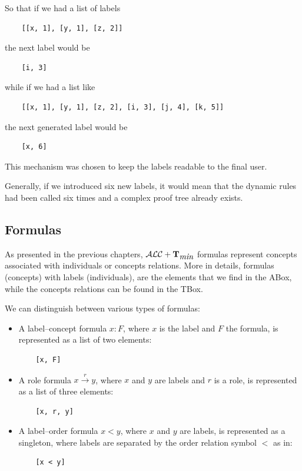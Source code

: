 \documentclass[a4paper, 11pt, oneside]{duthesis}
\newcommand{\tip}{{\bf T}}
\newcommand{\alctmin}{\mathcal{ALC}+\tip_{\mbox{\em min}}}
\newcommand{\trans}[1]{\stackrel{#1}{\longrightarrow}}
\begin{document}
\newpage

So that if we had a list of labels
\begin{verbatim}
    [[x, 1], [y, 1], [z, 2]]
\end{verbatim}
the next label would be
\begin{verbatim}
    [i, 3]
\end{verbatim}
while if we had a list like
\begin{verbatim}
    [[x, 1], [y, 1], [z, 2], [i, 3], [j, 4], [k, 5]]
\end{verbatim}
the next generated label would be
\begin{verbatim}
    [x, 6]
\end{verbatim}

This mechanism was chosen to keep the labels readable to the final user.

Generally, if we introduced six new labels, it would mean that the dynamic rules had been called six times and a complex proof tree already exists.

\subsection{Formulas}
As presented in the previous chapters, $\alctmin$ formulas represent concepts associated with individuals or concepts relations.
More in details, formulas (concepts) with labels (individuals), are the elements that we find in the ABox, while the concepts relations can be found in the TBox.

We can distinguish between various types of formulas:
\begin{itemize}
\item A label--concept formula $x : F$, where $x$ is the label and $F$ the formula, is represented as a list of two elements:
\begin{verbatim}
    [x, F]
\end{verbatim}
\item A role formula $x \trans{r} y$, where $x$ and $y$ are labels and $r$ is a role, is represented as a list of three elements:
\begin{verbatim}
    [x, r, y]
\end{verbatim}
\item A label--order formula $x < y$, where $x$ and $y$ are labels, is represented as a singleton, where labels are separated by the order relation symbol $<$ as in:
\begin{verbatim}
    [x < y]
\end{verbatim}
\end{itemize}
\end{document}
